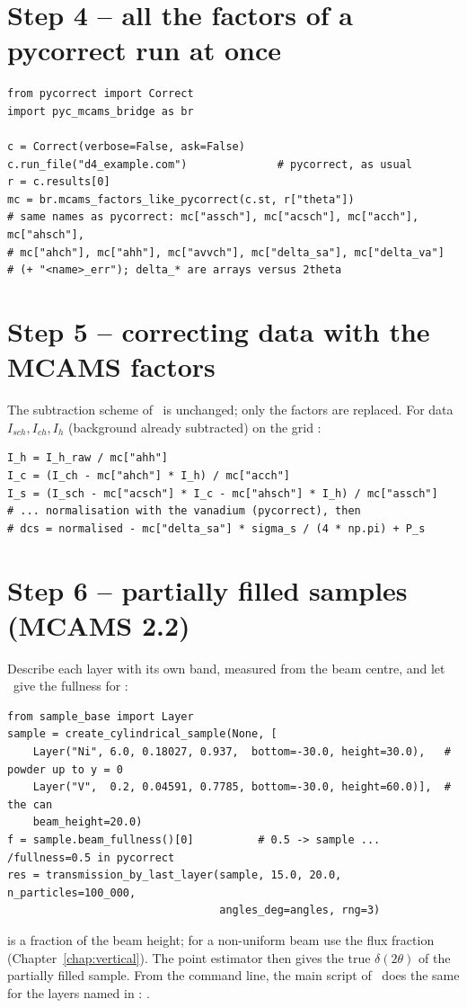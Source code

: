 \documentclass[11pt,a4paper]{report}
\begin{document}
\section{Step 4 -- all the factors of a pycorrect run at once}

\begin{lstlisting}
from pycorrect import Correct
import pyc_mcams_bridge as br

c = Correct(verbose=False, ask=False)
c.run_file("d4_example.com")              # pycorrect, as usual
r = c.results[0]
mc = br.mcams_factors_like_pycorrect(c.st, r["theta"])
# same names as pycorrect: mc["assch"], mc["acsch"], mc["acch"], mc["ahsch"],
# mc["ahch"], mc["ahh"], mc["avvch"], mc["delta_sa"], mc["delta_va"]
# (+ "<name>_err"); delta_* are arrays versus 2theta
\end{lstlisting}

\section{Step 5 -- correcting data with the MCAMS factors}

The subtraction scheme of \cor\ is unchanged; only the factors are replaced.
For data $I_{sch}, I_{ch}, I_h$ (background already subtracted) on the grid
:

\begin{lstlisting}
I_h = I_h_raw / mc["ahh"]
I_c = (I_ch - mc["ahch"] * I_h) / mc["acch"]
I_s = (I_sch - mc["acsch"] * I_c - mc["ahsch"] * I_h) / mc["assch"]
# ... normalisation with the vanadium (pycorrect), then
# dcs = normalised - mc["delta_sa"] * sigma_s / (4 * np.pi) + P_s
\end{lstlisting}

\section{Step 6 -- partially filled samples (MCAMS 2.2)}

Describe each layer with its own band, measured from the beam centre, and let
\mcams\ give the fullness for \pyc:
\begin{lstlisting}
from sample_base import Layer
sample = create_cylindrical_sample(None, [
    Layer("Ni", 6.0, 0.18027, 0.937,  bottom=-30.0, height=30.0),   # powder up to y = 0
    Layer("V",  0.2, 0.04591, 0.7785, bottom=-30.0, height=60.0)],  # the can
    beam_height=20.0)
f = sample.beam_fullness()[0]          # 0.5 -> sample ... /fullness=0.5 in pycorrect
res = transmission_by_last_layer(sample, 15.0, 20.0, n_particles=100_000,
                                 angles_deg=angles, rng=3)
\end{lstlisting}
 is a fraction of the beam height; for a non-uniform beam
use the flux fraction (Chapter~\ref{chap:vertical}). The point estimator then
gives the true $\delta(2\theta)$ of the partially filled sample. From the
command line, the main script of \mcams\ does the same for the layers named in
: .
\end{document}
